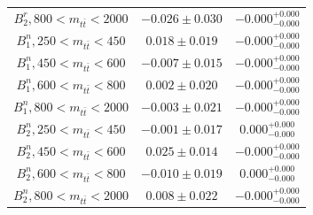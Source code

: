 \begin{refsection}
\begin{table}[htb]
\begin{tabular}{c | c c}
$B_{2}^{r}, {800 < m_{t\bar{t}} < 2000}$ & $-0.026 \pm 0.030$ & $-0.000^{+0.000}_{-0.000}$ \\
$B_{1}^{n}, {250 < m_{t\bar{t}} < 450}$ & $0.018 \pm 0.019$ & $-0.000^{+0.000}_{-0.000}$ \\
$B_{1}^{n}, {450 < m_{t\bar{t}} < 600}$ & $-0.007 \pm 0.015$ & $-0.000^{+0.000}_{-0.000}$ \\
$B_{1}^{n}, {600 < m_{t\bar{t}} < 800}$ & $0.002 \pm 0.020$ & $-0.000^{+0.000}_{-0.000}$ \\
$B_{1}^{n}, {800 < m_{t\bar{t}} < 2000}$ & $-0.003 \pm 0.021$ & $-0.000^{+0.000}_{-0.000}$ \\
$B_{2}^{n}, {250 < m_{t\bar{t}} < 450}$ & $-0.001 \pm 0.017$ & $0.000^{+0.000}_{-0.000}$ \\
$B_{2}^{n}, {450 < m_{t\bar{t}} < 600}$ & $0.025 \pm 0.014$ & $-0.000^{+0.000}_{-0.000}$ \\
$B_{2}^{n}, {600 < m_{t\bar{t}} < 800}$ & $-0.010 \pm 0.019$ & $0.000^{+0.000}_{-0.000}$ \\
$B_{2}^{n}, {800 < m_{t\bar{t}} < 2000}$ & $0.008 \pm 0.022$ & $-0.000^{+0.000}_{-0.000}$ \\
\hline
\end{tabular}
\label{tab:Extracted_Coefficients_2D_Polarizations}
\end{table}


\end{refsection}
